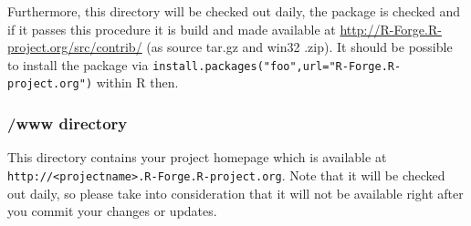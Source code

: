 \documentclass[a4paper]{article}
\begin{document}
Furthermore, this directory will be checked out daily, the package is
checked and if it passes this procedure it is build and made available at\newline
\url{http://R-Forge.R-project.org/src/contrib/} (as source tar.gz and win32
.zip). It should be possible to install the package via
\texttt{install.packages("foo",url="R-Forge.R-project.org")} within R
then.

\subsubsection{/www directory}
This directory contains your project homepage which is available at
\texttt{http://<projectname>.R-Forge.R-project.org}.
Note that it will be checked out daily, so please take
into consideration that it will not be available right after you
commit your changes or updates. 





\end{document}
